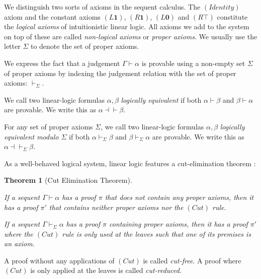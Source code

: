 \documentclass[acmtocl]{acmtrans2m}
\newtheorem{theorem}{Theorem}[section]
\newcommand\equivll{\dashv\vdash}
\newcommand{\lone}{\boldsymbol{1}}
\newcommand{\lzero}{\boldsymbol{0}}
\newcommand{\ltop}{\boldsymbol{\top}}
\begin{document}
We distinguish two sorts of axioms in the sequent calculus. The $(Identity)$
axiom and the constant axioms $(L\lone)$, $(R\lone)$, $(L\lzero)$ and $(R\ltop)$
constitute the \emph{logical axioms} of intuitionistic linear logic. All axioms
we add to the system on top of these are called \emph{non-logical axioms} or
\emph{proper axioms}. We usually use the letter $\Sigma$ to denote the set of
proper axioms.

We express the fact that a judgement $\Gamma\vdash\alpha$ is provable using a
non-empty set $\Sigma$ of proper axioms by indexing the judgement relation with
the set of proper axioms: $\vdash_\Sigma$.

\begin{definition}
	\label{def:ll-equiv}
\begin{longenum}
 \item We call two linear-logic formulas $\alpha,\beta$ \emph{logically
 equivalent} if both $\alpha\vdash\beta$ and $\beta\vdash\alpha$ are provable. We write
this as $\alpha\equivll\beta$.
 \item For any set of proper axioms $\Sigma$, we call two linear-logic formulas
 $\alpha,\beta$ \emph{logically equivalent modulo $\Sigma$} if both
 $\alpha\vdash_\Sigma\beta$ and $\beta\vdash_\Sigma\alpha$ are provable. We
 write this as $\alpha\dashv\vdash_\Sigma\beta$.
\end{longenum}
\end{definition}

As a well-behaved logical system, linear logic features a cut-elimination
theorem \cite{DBLP:journals/tcs/Girard87}:

\begin{theorem}[Cut Elimination Theorem]
\label{thm:cut-elim}
\begin{longenum}
  \item \label{prop:cut-free} If a sequent $\Gamma\vdash\alpha$ has a proof $\pi$
  that does not contain any proper axioms, then it has a proof $\pi'$ that
  contains neither proper axioms nor the $(Cut)$ rule.
  \item \label{prop:cut-red} If a sequent $\Gamma\vdash_\Sigma\alpha$ has a proof
  $\pi$ containing proper axioms, then it has a proof $\pi'$ where the $(Cut)$
  rule is only used at the leaves such that one of its premises is an axiom.
\end{longenum}
\end{theorem}

A proof without any applications of $(Cut)$ is called \emph{cut-free}. A proof where
$(Cut)$ is only applied at the leaves is called \emph{cut-reduced}.
\end{document}
